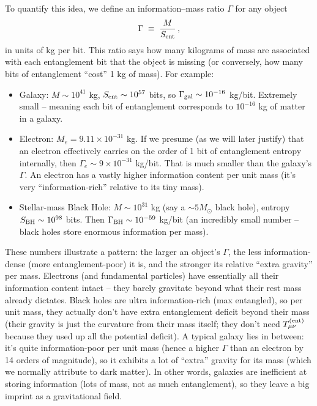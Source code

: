 \documentclass[11pt]{article}
\begin{document}
To quantify this idea, we define an information–mass ratio $\Gamma$ for any object​
\begin{equation*}
\Gamma \;\equiv\; \frac{M}{S_{\rm ent}}\,,
\end{equation*}
in units of kg per bit. This ratio says how many kilograms of mass are associated with each entanglement bit that the object is missing (or conversely, how many bits of entanglement “cost” 1 kg of mass). For example:
\begin{itemize}
    \item Galaxy: $M \sim 10^{41}$ kg, $S_{\rm ent}\sim10^{57}$ bits, so $\Gamma_{\rm gal} \sim 10^{-16}$ kg/bit​. Extremely small – meaning each bit of entanglement corresponds to $10^{-16}$ kg of matter in a galaxy.
    \item Electron: $M_e = 9.11\times10^{-31}$ kg. If we presume (as we will later justify) that an electron effectively carries on the order of 1 bit of entanglement entropy internally, then $\Gamma_e \sim 9\times10^{-31}$ kg/bit​. That is much smaller than the galaxy’s $\Gamma$. An electron has a vastly higher information content per unit mass (it’s very “information-rich” relative to its tiny mass).
    \item Stellar-mass Black Hole: $M \sim 10^{31}$ kg (say a $\sim 5 M_\odot$ black hole), entropy $S_{\rm BH}\sim 10^{98}$ bits. Then $\Gamma_{\rm BH} \sim 10^{-59}$ kg/bit (an incredibly small number – black holes store enormous information per mass)​.
\end{itemize}

These numbers illustrate a pattern​: the larger an object's $\Gamma$, the less information-dense (more entanglement-poor) it is, and the stronger its relative “extra gravity” per mass. Electrons (and fundamental particles) have essentially all their information content intact – they barely gravitate beyond what their rest mass already dictates. Black holes are ultra information-rich (max entangled), so per unit mass, they actually don’t have extra entanglement deficit beyond their mass (their gravity is just the curvature from their mass itself; they don't need $T_{\mu\nu}^{\rm (ent)}$ because they used up all the potential deficit). A typical galaxy lies in between: it’s quite information-poor per unit mass (hence a higher $\Gamma$ than an electron by 14 orders of magnitude), so it exhibits a lot of “extra” gravity for its mass (which we normally attribute to dark matter). In other words, galaxies are inefficient at storing information (lots of mass, not as much entanglement), so they leave a big imprint as a gravitational field​.
\end{document}
